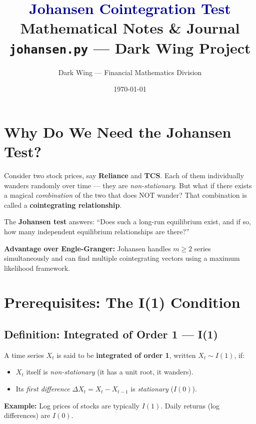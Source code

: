 \documentclass[12pt, a4paper]{article}
\title{
    \Huge\textbf{\textcolor{darkblue}{Johansen Cointegration Test}} \\[0.5em]
    \Large Mathematical Notes \& Journal \\[0.5em]
    \large \texttt{johansen.py} — Dark Wing Project
}
\author{Dark Wing — Financial Mathematics Division}
\date{\today}
\begin{document}
\maketitle
\tableofcontents
\newpage

\section{Why Do We Need the Johansen Test?}

Consider two stock prices, say \textbf{Reliance} and \textbf{TCS}. 
Each of them individually wanders randomly over time — they are \emph{non-stationary}. 
But what if there exists a magical \emph{combination} of the two that does NOT wander?
That combination is called a \textbf{cointegrating relationship}.

\medskip
The \textbf{Johansen test} answers: ``Does such a long-run equilibrium exist, and if so, 
how many independent equilibrium relationships are there?''

\medskip
\textbf{Advantage over Engle-Granger:} Johansen handles $m \geq 2$ series simultaneously 
and can find multiple cointegrating vectors using a maximum likelihood framework.

\section{Prerequisites: The I(1) Condition}

\subsection{Definition: Integrated of Order 1 — I(1)}

A time series $X_t$ is said to be \textbf{integrated of order 1}, written $X_t \sim I(1)$, if:
\begin{itemize}
    \item $X_t$ itself is \emph{non-stationary} (it has a unit root, it wanders).
    \item Its \emph{first difference} $\Delta X_t = X_t - X_{t-1}$ is \emph{stationary} ($I(0)$).
\end{itemize}

\textbf{Example:} Log prices of stocks are typically $I(1)$. Daily returns (log differences) are $I(0)$.
\end{document}
